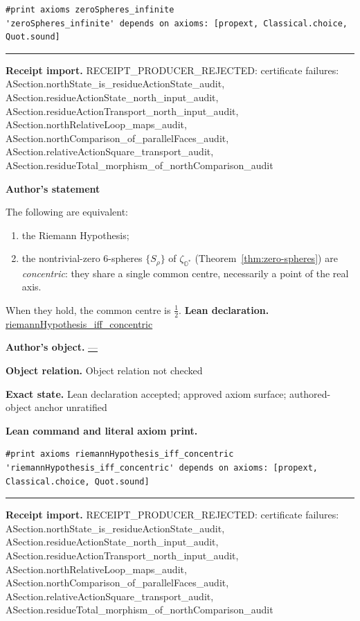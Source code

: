 \documentclass[11pt]{article}
\newcommand{\OO}{\mathbb{O}}
\newcommand{\Ostar}{\OO^{*}}
\newcommand{\zetaO}{\zeta_{\Ostar}}
\theoremstyle{plain}
\theoremstyle{definition}
\theoremstyle{remark}
\begin{document}
\begin{tcolorbox}
\begin{Verbatim}[breaklines=true,breakanywhere=true,fontsize=\small]
#print axioms zeroSpheres_infinite
'zeroSpheres_infinite' depends on axioms: [propext, Classical.choice, Quot.sound]
\end{Verbatim}
\medskip\hrule\medskip
\textbf{Receipt import.} \textcolor{KgtRed}{RECEIPT\_PRODUCER\_REJECTED: certificate failures: ASection.northState\_is\_residueActionState\_audit, ASection.residueActionState\_north\_input\_audit, ASection.residueActionTransport\_north\_input\_audit, ASection.northRelativeLoop\_maps\_audit, ASection.northComparison\_of\_parallelFaces\_audit, ASection.relativeActionSquare\_transport\_audit, ASection.residueTotal\_morphism\_of\_northComparison\_audit}
\end{tcolorbox}
\medskip
\begin{tcolorbox}[provenancecard,title={36. Theorem - The equivalence: concentricity \$\textbackslash{}Leftrightarrow\$ RH},title after break={36. Theorem - The equivalence: concentricity \$\textbackslash{}Leftrightarrow\$ RH (continued)}]
\textbf{Author's statement}\par
The following are equivalent:
\begin{enumerate}[leftmargin=2.4em]
\item[(a)] the Riemann Hypothesis;
\item[(b)] the nontrivial-zero $6$-spheres $\{S_\rho\}$ of $\zetaO$
  (Theorem~\ref{thm:zero-spheres}) are \emph{concentric}: they share a single common
  centre, necessarily a point of the real axis.
\end{enumerate}
When they hold, the common centre is $\tfrac12$.
\tcblower
\textbf{Lean declaration.} \url{riemannHypothesis_iff_concentric}
\par\textbf{Author's object.} \url{—}
\par\textbf{Object relation.} Object relation not checked
\par\textbf{Exact state.} Lean declaration accepted; approved axiom surface; authored-object anchor unratified
\par\smallskip\textbf{Lean command and literal axiom print.}
\begin{Verbatim}[breaklines=true,breakanywhere=true,fontsize=\small]
#print axioms riemannHypothesis_iff_concentric
'riemannHypothesis_iff_concentric' depends on axioms: [propext, Classical.choice, Quot.sound]
\end{Verbatim}
\medskip\hrule\medskip
\textbf{Receipt import.} \textcolor{KgtRed}{RECEIPT\_PRODUCER\_REJECTED: certificate failures: ASection.northState\_is\_residueActionState\_audit, ASection.residueActionState\_north\_input\_audit, ASection.residueActionTransport\_north\_input\_audit, ASection.northRelativeLoop\_maps\_audit, ASection.northComparison\_of\_parallelFaces\_audit, ASection.relativeActionSquare\_transport\_audit, ASection.residueTotal\_morphism\_of\_northComparison\_audit}
\end{tcolorbox}
\end{document}
